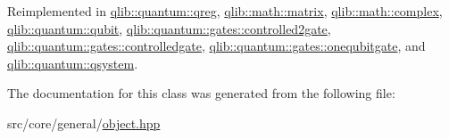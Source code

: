 Reimplemented in \hyperlink{classqlib_1_1quantum_1_1qreg_ae4dbf316bf6452f3110cb05146f54954}{qlib\+::quantum\+::qreg}, \hyperlink{classqlib_1_1math_1_1matrix_a06ec639a654b5319f4eb1bff591d6e7b}{qlib\+::math\+::matrix}, \hyperlink{classqlib_1_1math_1_1complex_afd24fadb21a07815675481b131398cff}{qlib\+::math\+::complex}, \hyperlink{classqlib_1_1quantum_1_1qubit_a8bf29d1f66508e4878ea861c5d8e44ec}{qlib\+::quantum\+::qubit}, \hyperlink{classqlib_1_1quantum_1_1gates_1_1controlled2gate_a4fda814b0336d103f5cdb7ea98507bd1}{qlib\+::quantum\+::gates\+::controlled2gate}, \hyperlink{classqlib_1_1quantum_1_1gates_1_1controlledgate_a87b4d6e66acffc4e14eb3e39a19c4bee}{qlib\+::quantum\+::gates\+::controlledgate}, \hyperlink{classqlib_1_1quantum_1_1gates_1_1onequbitgate_a38af1af0f466add047c3e75780e28c80}{qlib\+::quantum\+::gates\+::onequbitgate}, and \hyperlink{classqlib_1_1quantum_1_1qsystem_a9d95030955e2fdb26bc9152c32310e7e}{qlib\+::quantum\+::qsystem}.



The documentation for this class was generated from the following file\+:\begin{DoxyCompactItemize}
\item 
src/core/general/\hyperlink{object_8hpp}{object.\+hpp}\end{DoxyCompactItemize}
